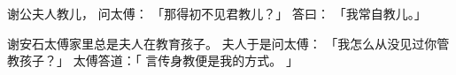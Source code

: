 
\switchcolumn*[\section{}]

谢公夫人教儿，
问太傅：
「那得初不见君教儿？」
答曰：
「我常自教儿。」

\switchcolumn

谢安石太傅家里总是夫人在教育孩子。
夫人于是问太傅：
「我怎么从没见过你管教孩子？」
太傅答道：「
    言传身教便是我的方式。
」
